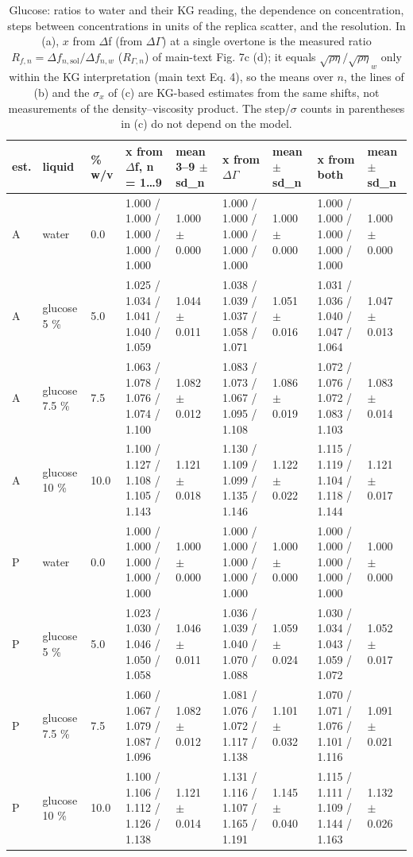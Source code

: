 \documentclass[11pt,a4paper]{article}
\begin{document}
\begin{landscape}{\scriptsize\setlength{\tabcolsep}{2pt}
\begin{longtable}{@{}lllllllll@{}}
\caption{Glucose: ratios to water and their KG reading, the dependence on concentration, steps between concentrations in units of the replica scatter, and the resolution. In (a), $x$ from $\Delta$f (from $\Delta$$\Gamma$) at a single overtone is the measured ratio $R_{f,n} = \Delta f_{n,\mathrm{sol}}/\Delta f_{n,w}$ ($R_{\Gamma,n}$) of main-text Fig. 7c (d); it equals $\sqrt{\rho\eta}/\sqrt{\rho\eta}_w$ only within the KG interpretation (main text Eq. 4), so the means over $n$, the lines of (b) and the $\sigma_x$ of (c) are KG-based estimates from the same shifts, not measurements of the density--viscosity product. The step/$\sigma$ counts in parentheses in (c) do not depend on the model.}\\
\toprule
est. & liquid & \% w/v & x from $\Delta$f, n = 1\ldots{}9 & mean 3--9 $\pm$ sd\_n & x from $\Delta$$\Gamma$ & mean $\pm$ sd\_n & x from both & mean $\pm$ sd\_n \\\midrule\endhead
A & water & 0.0 & 1.000 / 1.000 / 1.000 / 1.000 / 1.000 & 1.000 $\pm$ 0.000 & 1.000 / 1.000 / 1.000 / 1.000 / 1.000 & 1.000 $\pm$ 0.000 & 1.000 / 1.000 / 1.000 / 1.000 / 1.000 & 1.000 $\pm$ 0.000 \\
A & glucose 5 \% & 5.0 & 1.025 / 1.034 / 1.041 / 1.040 / 1.059 & 1.044 $\pm$ 0.011 & 1.038 / 1.039 / 1.037 / 1.058 / 1.071 & 1.051 $\pm$ 0.016 & 1.031 / 1.036 / 1.040 / 1.047 / 1.064 & 1.047 $\pm$ 0.013 \\
A & glucose 7.5 \% & 7.5 & 1.063 / 1.078 / 1.076 / 1.074 / 1.100 & 1.082 $\pm$ 0.012 & 1.083 / 1.073 / 1.067 / 1.095 / 1.108 & 1.086 $\pm$ 0.019 & 1.072 / 1.076 / 1.072 / 1.083 / 1.103 & 1.083 $\pm$ 0.014 \\
A & glucose 10 \% & 10.0 & 1.100 / 1.127 / 1.108 / 1.105 / 1.143 & 1.121 $\pm$ 0.018 & 1.130 / 1.109 / 1.099 / 1.135 / 1.146 & 1.122 $\pm$ 0.022 & 1.115 / 1.119 / 1.104 / 1.118 / 1.144 & 1.121 $\pm$ 0.017 \\
P & water & 0.0 & 1.000 / 1.000 / 1.000 / 1.000 / 1.000 & 1.000 $\pm$ 0.000 & 1.000 / 1.000 / 1.000 / 1.000 / 1.000 & 1.000 $\pm$ 0.000 & 1.000 / 1.000 / 1.000 / 1.000 / 1.000 & 1.000 $\pm$ 0.000 \\
P & glucose 5 \% & 5.0 & 1.023 / 1.030 / 1.046 / 1.050 / 1.058 & 1.046 $\pm$ 0.011 & 1.036 / 1.039 / 1.040 / 1.070 / 1.088 & 1.059 $\pm$ 0.024 & 1.030 / 1.034 / 1.043 / 1.059 / 1.072 & 1.052 $\pm$ 0.017 \\
P & glucose 7.5 \% & 7.5 & 1.060 / 1.067 / 1.079 / 1.087 / 1.096 & 1.082 $\pm$ 0.012 & 1.081 / 1.076 / 1.072 / 1.117 / 1.138 & 1.101 $\pm$ 0.032 & 1.070 / 1.071 / 1.076 / 1.101 / 1.116 & 1.091 $\pm$ 0.021 \\
P & glucose 10 \% & 10.0 & 1.100 / 1.106 / 1.112 / 1.126 / 1.138 & 1.121 $\pm$ 0.014 & 1.131 / 1.116 / 1.107 / 1.165 / 1.191 & 1.145 $\pm$ 0.040 & 1.115 / 1.111 / 1.109 / 1.144 / 1.163 & 1.132 $\pm$ 0.026 \\
\bottomrule
\end{longtable}}\end{landscape}
\end{document}

